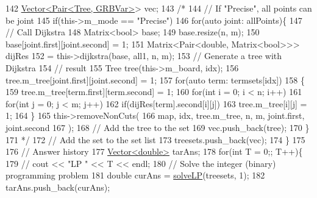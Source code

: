 \begin{DoxyCode}
142         \hyperlink{classVector}{Vector<Pair<Tree, GRBVar>}> vec;
143         \textcolor{comment}{/*}
144 \textcolor{comment}{        // If "Precise", all points can be joint}
145 \textcolor{comment}{        if(this->m\_mode == "Precise")}
146 \textcolor{comment}{            for(auto joint: allPoints)\{}
147 \textcolor{comment}{                // Call Dijkstra}
148 \textcolor{comment}{                Matrix<bool> base;}
149 \textcolor{comment}{                base.resize(n, m);}
150 \textcolor{comment}{                base[joint.first][joint.second] = 1;}
151 \textcolor{comment}{                Matrix<Pair<double, Matrix<bool>>> dijRes}
152 \textcolor{comment}{                    = this->dijkstra(base, all1, n, m);}
153 \textcolor{comment}{                // Generate a tree with Dijkstra}
154 \textcolor{comment}{                // result}
155 \textcolor{comment}{                Tree tree(this->m\_board, idx);}
156 \textcolor{comment}{                tree.m\_tree[joint.first][joint.second] = 1;}
157 \textcolor{comment}{                for(auto term: termsets[idx])}
158 \textcolor{comment}{                \{}
159 \textcolor{comment}{                    tree.m\_tree[term.first][term.second] = 1;}
160 \textcolor{comment}{                    for(int i = 0; i < n; i++)}
161 \textcolor{comment}{                        for(int j = 0; j < m; j++)}
162 \textcolor{comment}{                            if(dijRes[term].second[i][j])}
163 \textcolor{comment}{                                tree.m\_tree[i][j] = 1;}
164 \textcolor{comment}{                \}}
165 \textcolor{comment}{                this->removeNonCuts(}
166 \textcolor{comment}{                    map, idx, tree.m\_tree, n, m, joint.first, joint.second}
167 \textcolor{comment}{                );}
168 \textcolor{comment}{                // Add the tree to the set}
169 \textcolor{comment}{                vec.push\_back(tree);}
170 \textcolor{comment}{            \}}
171 \textcolor{comment}{        */}
172         \textcolor{comment}{// Add the set to the set list}
173         treesets.push\_back(vec);
174     \}
175     
176     \textcolor{comment}{// Answer history}
177     \hyperlink{classVector}{Vector<double>} tarAns;
178     \textcolor{keywordflow}{for}(\textcolor{keywordtype}{int} T = 0;; T++)\{
179         \textcolor{comment}{// cout << "LP " << T << endl;}
180         \textcolor{comment}{// Solve the integer (binary) programming problem}
181         \textcolor{keywordtype}{double} curAns = \hyperlink{classColumnGenSolve_aadb23efa531a3eb68651ba11f4d36c81}{solveLP}(treesets, 1);
182         tarAns.push\_back(curAns);

\end{DoxyCode}
